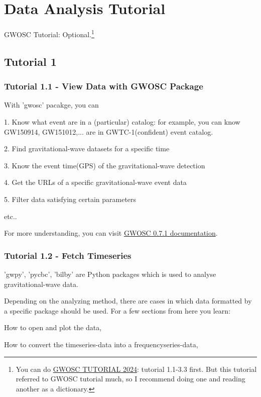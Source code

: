 \section{Data Analysis Tutorial}

GWOSC Tutorial: Optional.\footnote{You can do \href{https://gw-odw.thinkific.com/courses/odw2024}{GWOSC TUTORIAL 2024}: tutorial 1.1-3.3 first. But this tutorial referred to GWOSC tutorial much, so I recommend doing one and reading another as a dictionary.}

\subsection{Tutorial 1}

\subsubsection{Tutorial 1.1 - View Data with GWOSC Package}

With 'gwosc' pacakge, you can

1. Know what event are in a (particular) catalog: for example, you can know GW150914, GW151012,... are in GWTC-1(confident) event catalog.

2. Find gravitational-wave datasets for a specific time

3. Know the event time(GPS) of the gravitational-wave detection

4. Get the URLs of a specific gravitational-wave event data

5. Filter data satisfying certain parameters

etc..

For more understanding, you can visit \href{https://gwosc.readthedocs.io/en/stable/index.html}{GWOSC 0.7.1 documentation}.

\subsubsection{Tutorial 1.2 - Fetch Timeseries}

'gwpy', 'pycbc', 'bilby' are Python packages which is used to analyse gravitational-wave data.

Depending on the analyzing method, there are cases in which data formatted by a specific package should be used. For a few sections from here you learn:

How to open and plot the data,

How to convert the timeseries-data into a frequencyseries-data,

